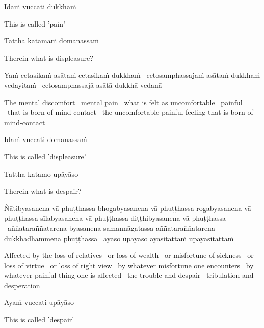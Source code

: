 Idaṁ vuccati dukkhaṁ

\begin{english}
  This is called 'pain'
\end{english}

Tattha katamaṁ domanassaṁ

\begin{english}
  Therein what is displeasure?
\end{english}

Yaṁ cetasikaṁ asātaṁ cetasikaṁ dukkhaṁ \breathmark\ cetosamphassajaṁ asātaṁ dukkhaṁ vedayitaṁ \breathmark\ cetosamphassajā asātā dukkhā vedanā

\begin{english}
  The mental discomfort \breathmark\ mental pain \breathmark\ what is felt as uncomfortable \breathmark\ painful \breathmark\ that is born of mind-contact \breathmark\ the uncomfortable painful feeling that is born of mind-contact
\end{english}

Idaṁ vuccati domanassaṁ

\begin{english}
  This is called 'displeasure'
\end{english}

Tattha katamo upāyāso

\begin{english}
  Therein what is despair?
\end{english}

Ñātibyasanena vā phuṭṭhassa bhogabyasanena vā phuṭṭhassa rogabyasanena vā phuṭṭhassa sīlabyasanena vā phuṭṭhassa diṭṭhibyasanena vā phuṭṭhassa \breathmark\ aññataraññatarena byasanena samannāgatassa aññataraññatarena dukkhadhammena phuṭṭhassa \breathmark\ āyāso upāyāso āyāsitattaṁ upāyāsitattaṁ

\begin{english}
  Affected by the loss of relatives \breathmark\ or loss of wealth \breathmark\ or misfortune of sickness \breathmark\ or loss of virtue \breathmark\ or loss of right view \breathmark\ by whatever misfortune one encounters \breathmark\ by whatever painful thing one is affected \breathmark\ the trouble and despair \breathmark\ tribulation and desperation
\end{english}

Ayaṁ vuccati upāyāso

\begin{english}
  This is called 'despair'
\end{english}

